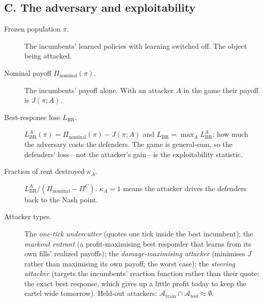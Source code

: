 \subsection*{C. The adversary and exploitability}
\begin{description}
\item[Frozen population $\pi$.] The incumbents' learned policies with learning switched off. The object being attacked.
\item[Nominal payoff $\Pi_{\mathrm{nominal}}(\pi)$.] The incumbents' payoff alone. With an attacker $A$ in the game their payoff is $J(\pi;A)$.
\item[Best-response loss $L_{\mathrm{BR}}$.] $L^A_{\mathrm{BR}}(\pi)=\Pi_{\mathrm{nominal}}(\pi)-J(\pi;A)$ and $L_{\mathrm{BR}}=\max_A L^A_{\mathrm{BR}}$: how much the adversary costs the defenders. The game is general-sum, so the defenders' loss---not the attacker's gain---is the exploitability statistic.
\item[Fraction of rent destroyed $\kappa_A$.] $L^A_{\mathrm{BR}}/(\Pi_{\mathrm{nominal}}-\Pi^C)$. $\kappa_A=1$ means the attacker drives the defenders back to the Nash point.
\item[Attacker types.] The \emph{one-tick undercutter} (quotes one tick inside the best incumbent); the \emph{markout entrant} (a profit-maximising best responder that learns from its own fills' realized payoffs); the \emph{damage-maximising attacker} (minimises $J$ rather than maximising its own payoff; the worst case); the \emph{steering attacker} (targets the incumbents' reaction function rather than their quote: the exact best response, which gives up a little profit today to keep the cartel wide tomorrow). Held-out attackers: $\mathcal{A}_{\mathrm{train}}\cap\mathcal{A}_{\mathrm{test}}\approx\emptyset$.
\end{description}

